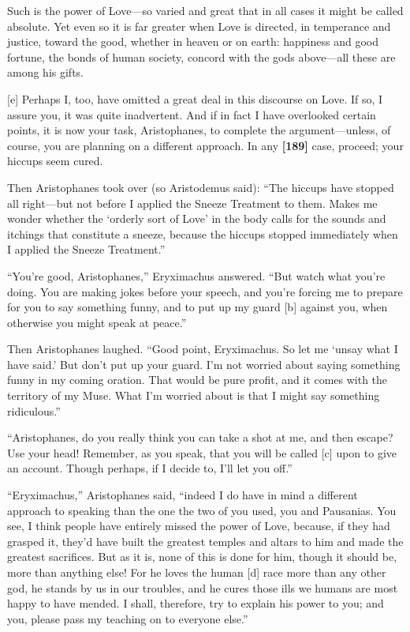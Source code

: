 Such is the power of Love---so varied and great that in all cases it
might be called absolute. Yet even so it is far greater when Love is
directed, in temperance and justice, toward the good, whether in heaven
or on earth: happiness and good fortune, the bonds of human society,
concord with the gods above---all these are among his gifts.

{[}e{]} Perhaps I, too, have omitted a great deal in this discourse on
Love. If so, I assure you, it was quite inadvertent. And if in fact I
have overlooked certain points, it is now your task, Aristophanes, to
complete the argument---unless, of course, you are planning on a
different approach. In any {\bf {[}189{]}} case, proceed; your hiccups
seem cured.\crlf
\crlf

Then Aristophanes took over (so Aristodemus said): “The hiccups have
stopped all right---but not before I applied the Sneeze Treatment to
them. Makes me wonder whether the ‘orderly sort of Love' in the body
calls for the sounds and itchings that constitute a sneeze, because the
hiccups stopped immediately when I applied the Sneeze Treatment.”

“You're good, Aristophanes,” Eryximachus answered. “But watch what
you're doing. You are making jokes before your speech, and you're
forcing me to prepare for you to say something funny, and to put up my
guard {[}b{]} against you, when otherwise you might speak at peace.”

Then Aristophanes laughed. “Good point, Eryximachus. So let me ‘unsay
what I have said.' But don't put up your guard. I'm not worried about
saying something funny in my coming oration. That would be pure profit,
and it comes with the territory of my Muse. What I'm worried about is
that I might say something ridiculous.”

“Aristophanes, do you really think you can take a shot at me, and then
escape? Use your head! Remember, as you speak, that you will be called
{[}c{]} upon to give an account. Though perhaps, if I decide to, I'll
let you off.”

“Eryximachus,” Aristophanes said, “indeed I do have in mind a different
approach to speaking than the one the two of you used, you and
Pausanias. You see, I think people have entirely missed the power of
Love, because, if they had grasped it, they'd have built the greatest
temples and altars to him and made the greatest sacrifices. But as it
is, none of this is done for him, though it should be, more than
anything else! For he loves the human {[}d{]} race more than any other
god, he stands by us in our troubles, and he cures those ills we humans
are most happy to have mended. I shall, therefore, try to explain his
power to you; and you, please pass my teaching on to everyone
else.”\crlf
\crlf


